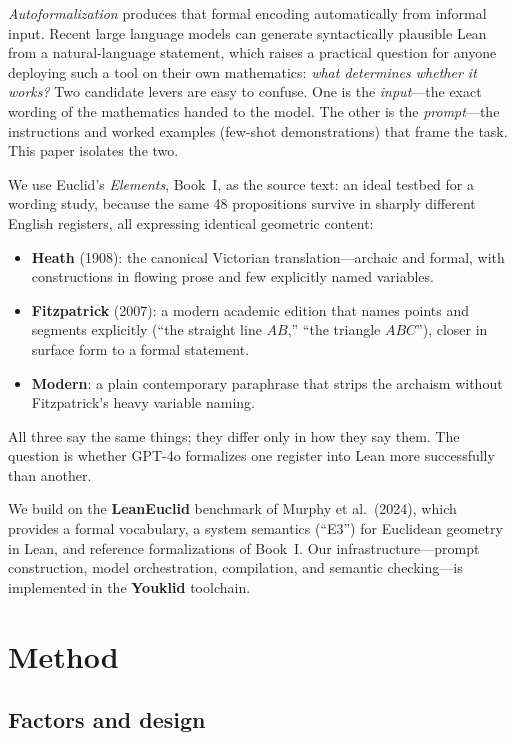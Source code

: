 \documentclass[11pt]{article}
\begin{document}
\emph{Autoformalization} produces that formal encoding automatically from
informal input. Recent large language models can generate syntactically
plausible Lean from a natural-language statement, which raises a practical
question for anyone deploying such a tool on their own mathematics: \emph{what
determines whether it works?} Two candidate levers are easy to confuse. One is
the \emph{input}---the exact wording of the mathematics handed to the model. The
other is the \emph{prompt}---the instructions and worked examples (few-shot
demonstrations) that frame the task. This paper isolates the two.

We use Euclid's \emph{Elements}, Book~I, as the source text: an ideal testbed
for a wording study, because the same 48 propositions survive in sharply
different English registers, all expressing identical geometric content:

\begin{itemize}
\setlength{\itemsep}{0.15em}
\item \textbf{Heath} (1908): the canonical Victorian translation---archaic and
formal, with constructions in flowing prose and few explicitly named variables.
\item \textbf{Fitzpatrick} (2007): a modern academic edition that names points
and segments explicitly (``the straight line $AB$,'' ``the triangle $ABC$''),
closer in surface form to a formal statement.
\item \textbf{Modern}: a plain contemporary paraphrase that strips the archaism
without Fitzpatrick's heavy variable naming.
\end{itemize}

All three say the same things; they differ only in how they say them. The
question is whether GPT-4o formalizes one register into Lean more successfully
than another.

We build on the \textbf{LeanEuclid} benchmark of Murphy et al.\ (2024), which
provides a formal vocabulary, a system semantics (``E3'') for Euclidean geometry
in Lean, and reference formalizations of Book~I. Our infrastructure---prompt
construction, model orchestration, compilation, and semantic checking---is
implemented in the \textbf{Youklid} toolchain.

\section{Method}

\subsection{Factors and design}
\end{document}
